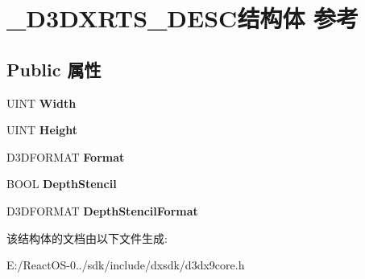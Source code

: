 \hypertarget{struct___d3_d_x_r_t_s___d_e_s_c}{}\section{\+\_\+\+D3\+D\+X\+R\+T\+S\+\_\+\+D\+E\+S\+C结构体 参考}
\label{struct___d3_d_x_r_t_s___d_e_s_c}
\subsection*{Public 属性}
\begin{DoxyCompactItemize}
\item 
\mbox{\label{struct___d3_d_x_r_t_s___d_e_s_c_a70bc486540be74e35476652e37d66b48}} 
U\+I\+NT {\bfseries Width}
\item 
\mbox{\label{struct___d3_d_x_r_t_s___d_e_s_c_ac042003b45187808125056dbda4159c8}} 
U\+I\+NT {\bfseries Height}
\item 
\mbox{\label{struct___d3_d_x_r_t_s___d_e_s_c_a567ce5904820c4237539ee4e7473699f}} 
D3\+D\+F\+O\+R\+M\+AT {\bfseries Format}
\item 
\mbox{\label{struct___d3_d_x_r_t_s___d_e_s_c_a82ab745f5f46155f76351d999f75b32f}} 
B\+O\+OL {\bfseries Depth\+Stencil}
\item 
\mbox{\label{struct___d3_d_x_r_t_s___d_e_s_c_ab6df27131b68392ba653e8d4614e0aa7}} 
D3\+D\+F\+O\+R\+M\+AT {\bfseries Depth\+Stencil\+Format}
\end{DoxyCompactItemize}


该结构体的文档由以下文件生成\+:\begin{DoxyCompactItemize}
\item 
E\+:/\+React\+O\+S-\/0../sdk/include/dxsdk/d3dx9core.\+h\end{DoxyCompactItemize}
